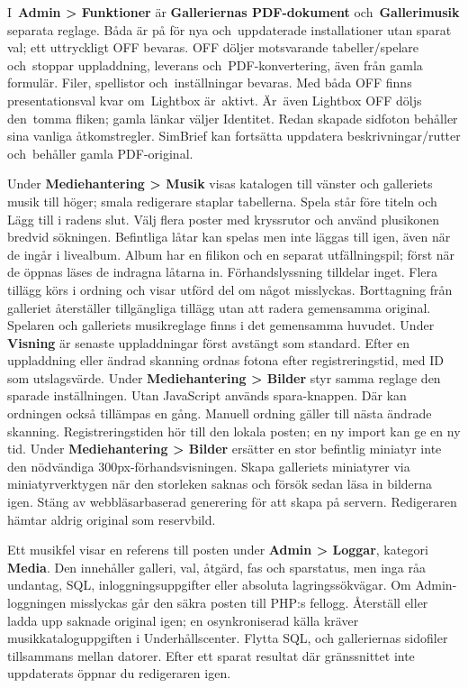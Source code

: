 \documentclass[11pt,a4paper]{article}
\newcommand{\filepath}[1]{\path{#1}}
\newcommand{\ui}[1]{\textbf{#1}}
\begin{document}
I~\ui{Admin > Funktioner} är \ui{Galleriernas PDF-dokument}
och~\ui{Gallerimusik} separata reglage. Båda är på för nya och~uppdaterade
installationer utan sparat val; ett uttryckligt OFF bevaras. OFF döljer
motsvarande tabeller/spelare och~stoppar uppladdning, leverans
och~PDF-konvertering,
även från gamla formulär. Filer, spellistor och~inställningar bevaras.
Med båda OFF finns presentationsval kvar om~Lightbox är~aktivt.
Är~även Lightbox OFF döljs den~tomma fliken; gamla länkar väljer Identitet.
Redan skapade sidfoton behåller sina vanliga åtkomstregler. SimBrief kan
fortsätta uppdatera beskrivningar/rutter och~behåller gamla PDF-original.

Under \ui{Mediehantering > Musik} visas katalogen till vänster och galleriets
musik till höger; smala redigerare staplar tabellerna. Spela står före titeln
och Lägg till i radens slut. Välj flera poster med kryssrutor och använd
plusikonen bredvid sökningen. Befintliga låtar kan spelas men inte läggas till
igen, även när de ingår i livealbum. Album har en filikon och en separat
utfällningspil; först när de öppnas läses de indragna låtarna in.
Förhandslyssning tilldelar inget. Flera tillägg körs i ordning och visar
utförd del om något misslyckas. Borttagning från galleriet återställer
tillgängliga tillägg utan att radera gemensamma original. Spelaren och
galleriets musikreglage finns i det gemensamma huvudet.
Under \ui{Visning} är senaste uppladdningar först avstängt som standard.
Efter en uppladdning eller ändrad skanning ordnas fotona efter registreringstid,
med ID som utslagsvärde. Under \ui{Mediehantering > Bilder} styr samma
reglage den sparade inställningen. Utan JavaScript används spara-knappen.
Där kan ordningen också tillämpas en gång. Manuell ordning gäller till nästa ändrade skanning.
Registreringstiden hör till den lokala posten; en ny import kan ge en ny tid.
Under \ui{Mediehantering > Bilder}
ersätter en stor befintlig miniatyr inte den nödvändiga 300px-förhandsvisningen.
Skapa galleriets miniatyrer via miniatyrverktygen när den storleken saknas
och försök sedan läsa in bilderna igen. Stäng av webbläsarbaserad generering
för att skapa på servern. Redigeraren hämtar aldrig original som reservbild.

Ett musikfel visar en referens till posten under \ui{Admin > Loggar},
kategori \ui{Media}. Den innehåller galleri, val, åtgärd, fas och sparstatus,
men inga råa undantag, SQL, inloggningsuppgifter eller absoluta
lagringssökvägar.
Om Admin-loggningen misslyckas går den säkra posten till PHP:s fellogg.
Återställ eller ladda upp saknade original igen; en osynkroniserad källa
kräver musikkataloguppgiften i Underhållscenter. Flytta SQL,
\filepath{data/music/} och galleriernas sidofiler tillsammans mellan datorer.
Efter ett sparat resultat där gränssnittet inte uppdaterats öppnar du
redigeraren igen.
\end{document}
